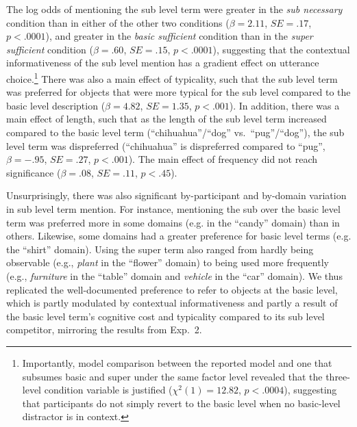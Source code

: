 \documentclass[11pt]{article}
\newcommand{\jd}[1]{\textcolor{Red}{[jd: #1]}}
\newcommand{\figref}[1]{Figure \ref{#1}}
\begin{document}
The log odds of mentioning the sub level term were greater in the \emph{sub necessary} condition than in either of the other two conditions ($\beta = 2.11$, $SE = .17$, $p < .0001$), and greater in the \emph{basic sufficient} condition than in the \emph{super sufficient} condition ($\beta = .60$, $SE = .15$, $p < .0001$), suggesting that the contextual informativeness of the sub level mention has a gradient effect on utterance choice.\footnote{Importantly, model comparison between the reported model and one that subsumes basic and super under the same factor level revealed that the three-level condition variable is justified ($\chi ^2 (1) = 12.82$, $p < .0004$), suggesting that participants do not simply revert to the basic level when no basic-level distractor is in context.} There was also a main effect of typicality, such that the sub level term was preferred for objects that were more typical for the sub level compared to the basic level  description ($\beta = 4.82$, $SE = 1.35$, $p < .001$). In addition, there was a main effect of length, such that as the length of the sub level term increased compared to the basic level term (``chihuahua''/``dog'' vs.~``pug''/``dog''), the sub level term was dispreferred (``chihuahua'' is dispreferred compared to ``pug'', $\beta = -.95$, $SE = .27$, $p < .001$). The main effect of frequency did not reach significance ($\beta = .08$, $SE = .11$, $p < .45$).


%


Unsurprisingly, there was also significant by-participant and by-domain variation in sub level term mention. %
For instance, mentioning the sub over the basic level term was preferred more in some domains (e.g. in the ``candy'' domain) than in others. Likewise, some domains had a greater preference for basic level terms (e.g. the ``shirt'' domain). Using the super term also ranged from hardly being observable (e.g., \emph{plant} in the ``flower'' domain) to being used more frequently (e.g., \emph{furniture} in the ``table'' domain and \emph{vehicle} in the ``car'' domain). 
We thus replicated the well-documented preference to refer to objects at the basic level, which is partly modulated by contextual informativeness and partly a result of the basic level term's cognitive cost and typicality compared to its sub level competitor, mirroring the results from Exp.~2. 
\end{document}
